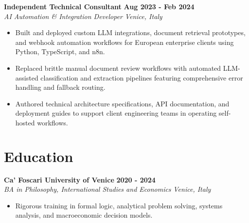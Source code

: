 \documentclass[10pt,a4paper]{article}
\newcommand{\role}[4]{%
  \textbf{#1} \hfill \textbf{#2}\\[1pt]%
  \textit{#3} \hfill \textit{#4}\\[2pt]%
}
\begin{document}
\role{Independent Technical Consultant}{Aug 2023 - Feb 2024}{AI Automation \& Integration Developer}{Venice, Italy}
\begin{itemize}
  \item Built and deployed custom LLM integrations, document retrieval prototypes, and webhook automation workflows for European enterprise clients using Python, TypeScript, and n8n.
  \item Replaced brittle manual document review workflows with automated LLM-assisted classification and extraction pipelines featuring comprehensive error handling and fallback routing.
  \item Authored technical architecture specifications, API documentation, and deployment guides to support client engineering teams in operating self-hosted workflows.
\end{itemize}

\section{Education}
\role{Ca' Foscari University of Venice}{2020 - 2024}{BA in Philosophy, International Studies and Economics}{Venice, Italy}
\begin{itemize}
  \item Rigorous training in formal logic, analytical problem solving, systems analysis, and macroeconomic decision models.
\end{itemize}
\end{document}
